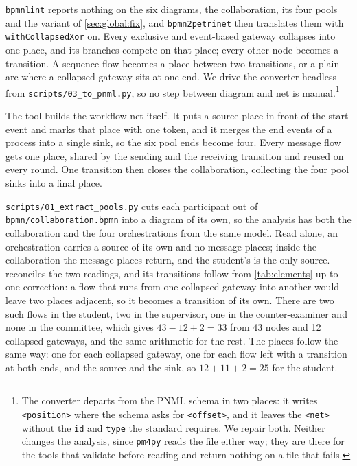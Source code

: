 \texttt{bpmnlint} reports nothing on the six diagrams, the collaboration, its four pools and the variant of \cref{sec:global:fix}, and \texttt{bpmn2petrinet} then translates them with \texttt{withCollapsedXor} on. Every exclusive and event-based gateway collapses into one place, and its branches compete on that place; every other node becomes a transition. A sequence flow becomes a place between two transitions, or a plain arc where a collapsed gateway sits at one end. We drive the converter headless from \texttt{scripts/03\_to\_pnml.py}, so no step between diagram and net is manual.\footnote{The converter departs from the PNML schema in two places: it writes \texttt{<position>} where the schema asks for \texttt{<offset>}, and it leaves the \texttt{<net>} without the \texttt{id} and \texttt{type} the standard requires. We repair both. Neither changes the analysis, since \texttt{pm4py} reads the file either way; they are there for the tools that validate before reading and return nothing on a file that fails.}

The tool builds the workflow net itself. It puts a source place in front of the start event and marks that place with one token, and it merges the end events of a process into a single sink, so the six pool ends become four. Every message flow gets one place, shared by the sending and the receiving transition and reused on every round. One transition then closes the collaboration, collecting the four pool sinks into a final place.

\texttt{scripts/01\_extract\_pools.py} cuts each participant out of \texttt{bpmn/collaboration.bpmn} into a diagram of its own, so the analysis has both the collaboration and the four orchestrations from the same model. Read alone, an orchestration carries a source of its own and no message places; inside the collaboration the message places return, and the student's is the only source.  reconciles the two readings, and its transitions follow from \cref{tab:elements} up to one correction: a flow that runs from one collapsed gateway into another would leave two places adjacent, so it becomes a transition of its own. There are two such flows in the student, two in the supervisor, one in the counter-examiner and none in the committee, which gives $43-12+2=33$ from 43 nodes and 12 collapsed gateways, and the same arithmetic for the rest. The places follow the same way: one for each collapsed gateway, one for each flow left with a transition at both ends, and the source and the sink, so $12+11+2=25$ for the student.

